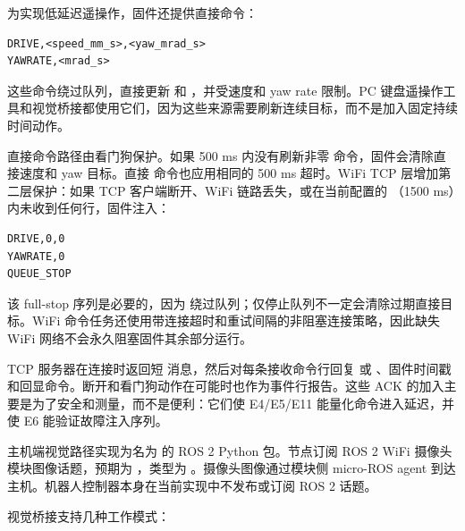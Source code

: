 \documentclass[12pt, a4paper]{article}
\begin{document}
为实现低延迟遥操作，固件还提供直接命令：

\begin{verbatim}
DRIVE,<speed_mm_s>,<yaw_mrad_s>
YAWRATE,<mrad_s>
\end{verbatim}

这些命令绕过队列，直接更新 \texttt{} 和 \texttt{}，并受速度和 yaw rate 限制。PC 键盘遥操作工具和视觉桥接都使用它们，因为这些来源需要刷新连续目标，而不是加入固定持续时间动作。

直接命令路径由看门狗保护。如果 500 ms 内没有刷新非零 \texttt{} 命令，固件会清除直接速度和 yaw 目标。直接 \texttt{} 命令也应用相同的 500 ms 超时。WiFi TCP 层增加第二层保护：如果 TCP 客户端断开、WiFi 链路丢失，或在当前配置的 \texttt{}（1500 ms）内未收到任何行，固件注入：

\begin{verbatim}
DRIVE,0,0
YAWRATE,0
QUEUE_STOP
\end{verbatim}

该 full-stop 序列是必要的，因为 \texttt{} 绕过队列；仅停止队列不一定会清除过期直接目标。WiFi 命令任务还使用带连接超时和重试间隔的非阻塞连接策略，因此缺失 WiFi 网络不会永久阻塞固件其余部分运行。

TCP 服务器在连接时返回短 \texttt{} 消息，然后对每条接收命令行回复 \texttt{} 或 \texttt{}、固件时间戳和回显命令。断开和看门狗动作在可能时也作为事件行报告。这些 ACK 的加入主要是为了安全和测量，而不是便利：它们使 E4/E5/E11 能量化命令进入延迟，并使 E6 能验证故障注入序列。

主机端视觉路径实现为名为 \texttt{} 的 ROS 2 Python 包。节点订阅 ROS 2 WiFi 摄像头模块图像话题，预期为 \texttt{}，类型为 \texttt{}。摄像头图像通过模块侧 micro-ROS agent 到达主机。机器人控制器本身在当前实现中不发布或订阅 ROS 2 话题。

视觉桥接支持几种工作模式：
\end{document}
